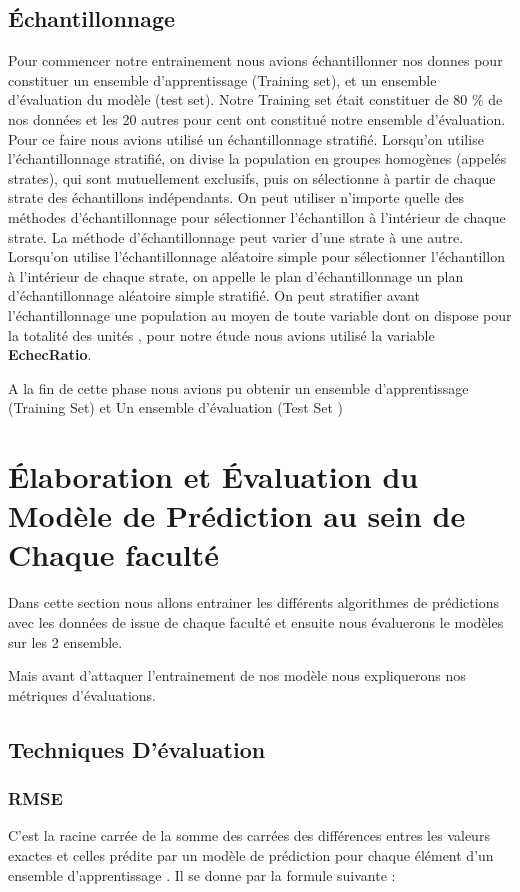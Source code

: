 \subsection{Échantillonnage  \cite{statBook1} } 
Pour commencer notre entrainement nous avions échantillonner nos donnes pour constituer un ensemble d'apprentissage (Training set), et un ensemble d'évaluation du modèle (test set). Notre Training set était constituer de 80 \% de nos données et les 20 autres pour cent ont constitué notre ensemble d'évaluation.
Pour ce faire nous avions utilisé un échantillonnage stratifié.
Lorsqu'on utilise l'échantillonnage stratifié, on divise la population en groupes homogènes (appelés strates), qui sont mutuellement exclusifs, puis on sélectionne à partir de chaque strate des échantillons indépendants. On peut utiliser n'importe quelle des méthodes d'échantillonnage  pour sélectionner l'échantillon à l'intérieur de chaque strate. La méthode d'échantillonnage peut varier d'une strate à une autre. Lorsqu'on utilise l'échantillonnage aléatoire simple pour sélectionner l'échantillon à l'intérieur de chaque strate, on appelle le plan d'échantillonnage un plan d'échantillonnage aléatoire simple stratifié. On peut stratifier avant l'échantillonnage une population au moyen de toute variable dont on dispose pour la totalité des unités , pour notre étude nous avions utilisé la variable \textbf{EchecRatio}.

A la fin de cette phase nous avions pu obtenir un ensemble d'apprentissage (Training Set) et Un ensemble d'évaluation (Test Set )

\section {Élaboration et Évaluation du Modèle de Prédiction au sein de Chaque faculté} 
Dans cette section nous allons entrainer les différents algorithmes de prédictions avec les données de issue de chaque faculté et ensuite nous évaluerons le modèles sur les 2 ensemble.

Mais avant d'attaquer l'entrainement de nos modèle nous expliquerons nos métriques d'évaluations.
\subsection{Techniques D'évaluation} 
\subsubsection{\ac{RMSE} \cite{ProbaStat} }
C'est la racine carrée de la somme des carrées des différences entres les valeurs exactes et celles prédite par un modèle de prédiction pour chaque élément d'un ensemble d'apprentissage .
Il se donne par la formule suivante  :

